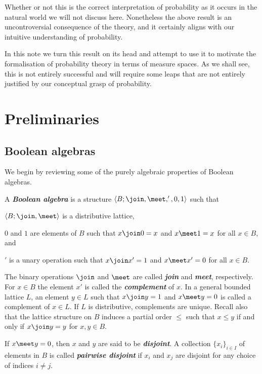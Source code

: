 \documentclass[article, a4paper, 11pt, oneside]{memoir}
\numberwithin{equation}{chapter}
\newcommand{\keyword}[1]{{\itshape\bfseries #1}}
\begin{document}
Whether or not this is the correct interpretation of probability as it occurs in the natural world we will not discuss here. Nonetheless the above result is an uncontroversial consequence of the theory, and it certainly aligns with our intuitive understanding of probability.

In this note we turn this result on its head and attempt to use it to motivate the formalisation of probability theory in terms of measure spaces. As we shall see, this is not entirely successful and will require some leaps that are not entirely justified by our conceptual grasp of probability.


\chapter{Preliminaries}


\section{Boolean algebras}

We begin by reviewing some of the purely algebraic properties of Boolean algebras.

\begin{definition}
    \label{def:Boolean-algebra}
    A \keyword{Boolean algebra} is a structure $\langle B; \join, \meet, ', 0, 1 \rangle$ such that
    \begin{enumdef}
        \item $\langle B; \join, \meet \rangle$ is a distributive lattice,
        \item $0$ and $1$ are elements of $B$ such that $x \join 0 = x$ and $x \meet 1 = x$ for all $x \in B$, and
        \item $'$ is a unary operation such that $x \join x' = 1$ and $x \meet x' = 0$ for all $x \in B$.
    \end{enumdef}
\end{definition}
%
The binary operations $\join$ and $\meet$ are called \keyword{join} and \keyword{meet}, respectively. For $x \in B$ the element $x'$ is called the \keyword{complement} of $x$. In a general bounded lattice $L$, an element $y \in L$ such that $x \join y = 1$ and $x \meet y = 0$ is called a complement of $x \in L$. If $L$ is distributive, complements are unique. Recall also that the lattice structure on $B$ induces a partial order $\leq$ such that $x \leq y$ if and only if $x \join y = y$ for $x,y \in B$.

If $x \meet y = 0$, then $x$ and $y$ are said to be \keyword{disjoint}. A collection $\{x_i\}_{i \in I}$ of elements in $B$ is called \keyword{pairwise disjoint} if $x_i$ and $x_j$ are disjoint for any choice of indices $i \neq j$.
\end{document}
